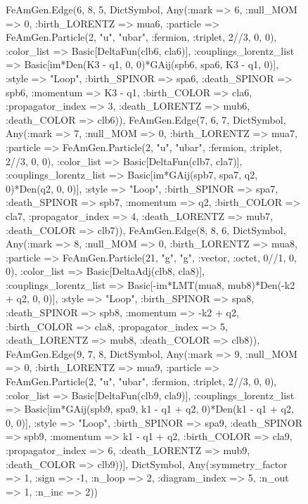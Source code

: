 \documentclass{revtex4}
\begin{document}
\begin{figure}[!htb]
\begin{center}
{FeAmGen.Edge(6, 8, 5, Dict{Symbol, Any}(:mark => 6, :null_MOM => 0, :birth_LORENTZ => mua6, :particle => FeAmGen.Particle(2, "u", "ubar", :fermion, :triplet, 2//3, 0, 0), :color_list => Basic[DeltaFun(clb6, cla6)], :couplings_lorentz_list => Basic[im*Den(K3 - q1, 0, 0)*GAij(spb6, spa6, K3 - q1, 0)], :style => "Loop", :birth_SPINOR => spa6, :death_SPINOR => spb6, :momentum => K3 - q1, :birth_COLOR => cla6, :propagator_index => 3, :death_LORENTZ => mub6, :death_COLOR => clb6)), FeAmGen.Edge(7, 6, 7, Dict{Symbol, Any}(:mark => 7, :null_MOM => 0, :birth_LORENTZ => mua7, :particle => FeAmGen.Particle(2, "u", "ubar", :fermion, :triplet, 2//3, 0, 0), :color_list => Basic[DeltaFun(clb7, cla7)], :couplings_lorentz_list => Basic[im*GAij(spb7, spa7, q2, 0)*Den(q2, 0, 0)], :style => "Loop", :birth_SPINOR => spa7, :death_SPINOR => spb7, :momentum => q2, :birth_COLOR => cla7, :propagator_index => 4, :death_LORENTZ => mub7, :death_COLOR => clb7)), FeAmGen.Edge(8, 8, 6, Dict{Symbol, Any}(:mark => 8, :null_MOM => 0, :birth_LORENTZ => mua8, :particle => FeAmGen.Particle(21, "g", "g", :vector, :octet, 0//1, 0, 0), :color_list => Basic[DeltaAdj(clb8, cla8)], :couplings_lorentz_list => Basic[-im*LMT(mua8, mub8)*Den(-k2 + q2, 0, 0)], :style => "Loop", :birth_SPINOR => spa8, :death_SPINOR => spb8, :momentum => -k2 + q2, :birth_COLOR => cla8, :propagator_index => 5, :death_LORENTZ => mub8, :death_COLOR => clb8)), FeAmGen.Edge(9, 7, 8, Dict{Symbol, Any}(:mark => 9, :null_MOM => 0, :birth_LORENTZ => mua9, :particle => FeAmGen.Particle(2, "u", "ubar", :fermion, :triplet, 2//3, 0, 0), :color_list => Basic[DeltaFun(clb9, cla9)], :couplings_lorentz_list => Basic[im*GAij(spb9, spa9, k1 - q1 + q2, 0)*Den(k1 - q1 + q2, 0, 0)], :style => "Loop", :birth_SPINOR => spa9, :death_SPINOR => spb9, :momentum => k1 - q1 + q2, :birth_COLOR => cla9, :propagator_index => 6, :death_LORENTZ => mub9, :death_COLOR => clb9))], Dict{Symbol, Any}(:symmetry_factor => 1, :sign => -1, :n_loop => 2, :diagram_index => 5, :n_out => 1, :n_inc => 2)) 
}
\end{center}
\end{figure}
\end{document}
